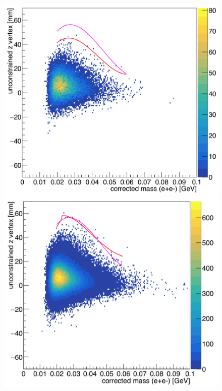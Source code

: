\begin{figure}[hbt]
\begin{minipage}{0.5\textwidth}
 \includegraphics[width=\textwidth]{pics/appendix/zVm_L1L2_0p5_bl.png}
\end{minipage}\hfill\begin{minipage}{0.5\textwidth}
 \includegraphics[width=\textwidth]{pics/appendix/zVm_L1L2_0p5_ub.png}
 \end{minipage}

\end{figure}
